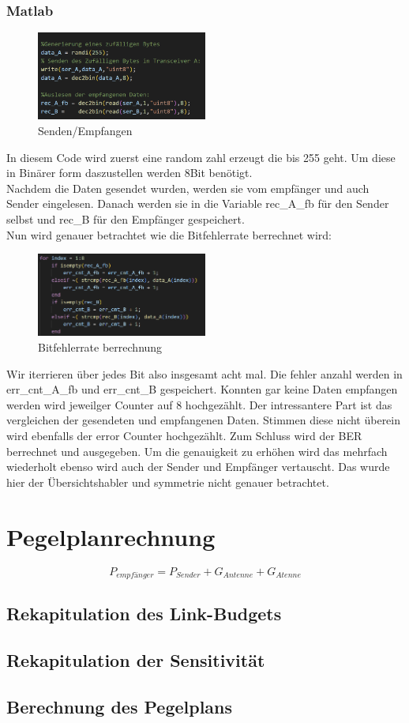 \subsubsection{Matlab}
\begin{figure}[H]
    \centering
    \includegraphics[width=0.5\textwidth]{Pictures/einlesenMatlab.png}
    \caption{Senden/Empfangen}
    \label{fig:matlab_example}
\end{figure}
In diesem Code wird zuerst eine random zahl erzeugt die bis 255 geht.
Um diese in Binärer form daszustellen werden 8Bit benötigt.
\\
Nachdem die Daten gesendet wurden, werden sie vom empfänger und auch Sender eingelesen.
Danach werden sie in die Variable rec\_A\_fb für den Sender selbst und rec\_B für den Empfänger gespeichert.
\\
Nun wird genauer betrachtet wie die Bitfehlerrate berrechnet wird:
\begin{figure}[H]
    \centering
    \includegraphics[width=0.5\textwidth]{Pictures/vergleich.png}
    \caption{Bitfehlerrate berrechnung}
    \label{fig:bitfehler}
\end{figure}
Wir iterrieren über jedes Bit also insgesamt acht mal.
Die fehler anzahl werden in err\_cnt\_A\_fb und err\_cnt\_B gespeichert.
Konnten gar keine Daten empfangen werden wird jeweilger Counter auf 8 hochgezählt.
Der intressantere Part ist das vergleichen der gesendeten und empfangenen Daten.
Stimmen diese nicht überein wird ebenfalls der error Counter hochgezählt.
Zum Schluss wird der BER berrechnet und ausgegeben.
Um die genauigkeit zu erhöhen wird das mehrfach wiederholt ebenso wird auch der Sender und Empfänger vertauscht.
Das wurde hier der Übersichtshabler und symmetrie nicht genauer betrachtet.



\section{Pegelplanrechnung}
\begin{equation}
    P_{empfänger} = P_{Sender} + G_{Antenne} + G_{Atenne}
\end{equation}
\subsection{Rekapitulation des Link-Budgets}
\subsection{Rekapitulation der Sensitivität}
\subsection{Berechnung des Pegelplans}